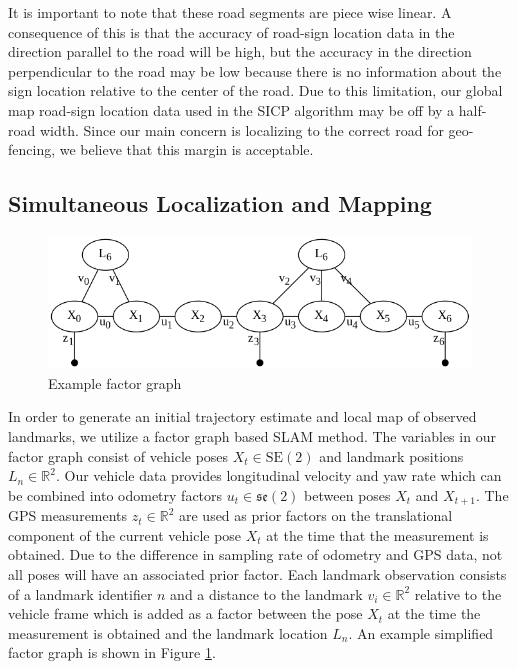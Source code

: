 \documentclass[letterpaper, 10 pt, conference]{ieeeconf}  %
\begin{document}
It is important to note that these road segments are piece wise linear. A consequence of this is that the accuracy of road-sign location data in the direction parallel to the road will be high, but the accuracy in the direction perpendicular to the road may be low because there is no information about the sign location relative to the center of the road. Due to this limitation, our global map road-sign location data used in the SICP algorithm may be off by a half-road width. Since our main concern is localizing to the correct road for geo-fencing, we believe that this margin is acceptable.

\subsection{Simultaneous Localization and Mapping}

\begin{figure}[thpb]
  \centering
  \includegraphics[width=\linewidth]{factor_graph.png}
  \caption{Example factor graph}
  \label{fig:factorgraph}
\end{figure}

In order to generate an initial trajectory estimate and local map of observed landmarks, we utilize a factor graph based SLAM method.
The variables in our factor graph consist of vehicle poses $X_t \in \mathrm{SE}(2)$ and landmark positions $L_n \in \mathbb{R}^2$.
Our vehicle data provides longitudinal velocity and yaw rate which can be combined into odometry factors $u_t \in \mathfrak{se}(2)$ between poses $X_t$ and $X_{t+1}$.
The GPS measurements $z_t \in \mathbb{R}^2$ are used as prior factors on the translational component of the current vehicle pose $X_t$ at the time that the measurement is obtained. Due to the difference in sampling rate of odometry and GPS data, not all poses will have an associated prior factor.
Each landmark observation consists of a landmark identifier $n$ and a distance to the landmark $v_i \in \mathbb{R}^2$ relative to the vehicle frame which is added as a factor between the pose $X_t$ at the time the measurement is obtained and the landmark location $L_n$.
An example simplified factor graph is shown in Figure \ref{fig:factorgraph}.
\end{document}
